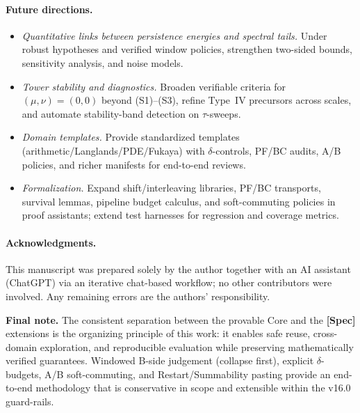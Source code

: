 \documentclass[11pt]{article}
\numberwithin{equation}{section}
\theoremstyle{plain}
\theoremstyle{definition}
\theoremstyle{remark}
\theoremstyle{plain}
\theoremstyle{definition}
\numberwithin{equation}{section}
\theoremstyle{definition}
\numberwithin{equation}{section}
\theoremstyle{plain}
\theoremstyle{definition}
\theoremstyle{remark}
\begin{document}
\paragraph{Future directions.}
\begin{itemize}
  \item \emph{Quantitative links between persistence energies and spectral tails.} Under robust hypotheses and verified window policies, strengthen two-sided bounds, sensitivity analysis, and noise models.
  \item \emph{Tower stability and diagnostics.} Broaden verifiable criteria for \((\mu,\nu)=(0,0)\) beyond (S1)–(S3), refine Type~IV precursors across scales, and automate stability-band detection on \(\tau\)-sweeps.
  \item \emph{Domain templates.} Provide standardized templates (arithmetic/Langlands/PDE/Fukaya) with \(\delta\)-controls, PF/BC audits, A/B policies, and richer manifests for end-to-end reviews.
  \item \emph{Formalization.} Expand shift/interleaving libraries, PF/BC transports, survival lemmas, pipeline budget calculus, and soft-commuting policies in proof assistants; extend test harnesses for regression and coverage metrics.
\end{itemize}

\paragraph{Acknowledgments.}
This manuscript was prepared solely by the author together with an AI assistant (ChatGPT) via an iterative chat-based workflow; no other contributors were involved. Any remaining errors are the authors' responsibility.

\medskip
\noindent\textbf{Final note.}
The consistent separation between the provable Core and the \textbf{[Spec]} extensions is the organizing principle of this work: it enables safe reuse, cross-domain exploration, and reproducible evaluation while preserving mathematically verified guarantees. Windowed B-side judgement (collapse first), explicit \(\delta\)-budgets, A/B soft-commuting, and Restart/Summability pasting provide an end-to-end methodology that is conservative in scope and extensible within the v16.0 guard-rails.
\end{document}
